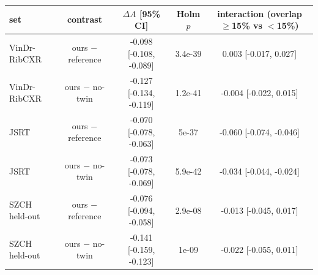 \begin{tabular}{lcccc}
\toprule
set & contrast & $\Delta A$ [95\% CI] & Holm $p$ & interaction (overlap $\geq$15\% vs $<$15\%) \\
\midrule
VinDr-RibCXR & ours $-$ reference & -0.098 [-0.108, -0.089] & 3.4e-39 & 0.003 [-0.017, 0.027] \\
VinDr-RibCXR & ours $-$ no-twin & -0.127 [-0.134, -0.119] & 1.2e-41 & -0.004 [-0.022, 0.015] \\
JSRT & ours $-$ reference & -0.070 [-0.078, -0.063] & 5e-37 & -0.060 [-0.074, -0.046] \\
JSRT & ours $-$ no-twin & -0.073 [-0.078, -0.069] & 5.9e-42 & -0.034 [-0.044, -0.024] \\
SZCH held-out & ours $-$ reference & -0.076 [-0.094, -0.058] & 2.9e-08 & -0.013 [-0.045, 0.017] \\
SZCH held-out & ours $-$ no-twin & -0.141 [-0.159, -0.123] & 1e-09 & -0.022 [-0.055, 0.011] \\
\bottomrule
\end{tabular}
